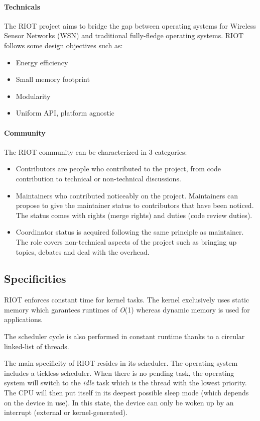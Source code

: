 \paragraph{Technicals} The RIOT project aims to bridge the gap between operating systems for Wireless Sensor Networks (WSN) and traditional fully-fledge operating systems.
RIOT follows some design objectives such as:
\begin{itemize}
    \item Energy efficiency
    \item Small memory footprint
    \item Modularity
    \item Uniform API, platform agnostic
\end{itemize}

\paragraph{Community} The RIOT community can be characterized in 3 categories\cite{RIOTComm}:
\begin{itemize}
    \item Contributors are people who contributed to the project, from code contribution to technical or non-technical discussions.
    \item Maintainers who contributed noticeably on the project.
        Maintainers can propose to give the maintainer status to contributors that have been noticed.
        The status comes with rights (merge rights) and duties (code review duties).
    \item Coordinator status is acquired following the same principle as maintainer.
        The role covers non-technical aspects of the project such as bringing up topics, debates and deal with the overhead.
\end{itemize}

\subsection{Specificities}
RIOT enforces constant time for kernel tasks.
The kernel exclusively uses static memory which garantees runtimes of \textit{O}(1) whereas dynamic memory is used for applications.

The scheduler cycle is also performed in constant runtime thanks to a circular linked-list of threads\cite{riotspec}.

The main specificity of RIOT resides in its scheduler.
The operating system includes a tickless scheduler.
When there is no pending task, the operating system will switch to the \textit{idle} task which is the thread with the lowest priority.
The CPU will then put itself in its deepest possible sleep mode (which depends on the device in use).
In this state, the device can only be woken up by an interrupt (external or kernel-generated).